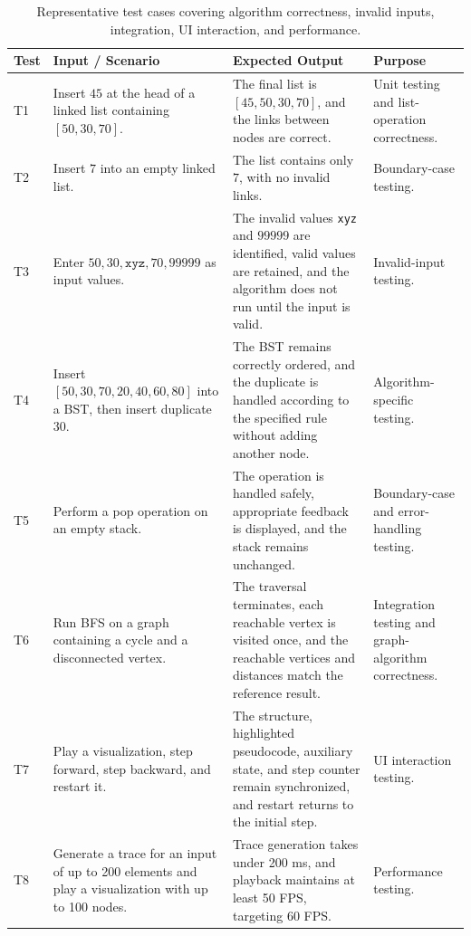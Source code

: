 \documentclass[11pt,a4paper]{article}
\renewcommand{\arraystretch}{1.06}
\begin{document}
\begin{table}[H]
\centering
\small
\renewcommand{\arraystretch}{1.3}
\begin{tabularx}{\textwidth}{
    @{}
    >{\centering\arraybackslash}p{}
    >{\raggedright\arraybackslash}p{}
    >{\raggedright\arraybackslash}X
    >{\raggedright\arraybackslash}p{}
    @{}
}
\toprule
\textbf{Test} &
\textbf{Input / Scenario} &
\textbf{Expected Output} &
\textbf{Purpose} \\
\midrule

T1 &
Insert $45$ at the head of a linked list containing $[50, 30, 70]$. &
The final list is $[45, 50, 30, 70]$, and the links between nodes are correct. &
Unit testing and list-operation correctness. \\

T2 &
Insert $7$ into an empty linked list. &
The list contains only $7$, with no invalid links. &
Boundary-case testing. \\

T3 &
Enter $50, 30, \texttt{xyz}, 70, 99999$ as input values. &
The invalid values \texttt{xyz} and $99999$ are identified, valid values are retained, and the algorithm does not run until the input is valid. &
Invalid-input testing. \\

T4 &
Insert $[50, 30, 70, 20, 40, 60, 80]$ into a BST, then insert duplicate $30$. &
The BST remains correctly ordered, and the duplicate is handled according to the specified rule without adding another node. &
Algorithm-specific testing. \\

T5 &
Perform a pop operation on an empty stack. &
The operation is handled safely, appropriate feedback is displayed, and the stack remains unchanged. &
Boundary-case and error-handling testing. \\

T6 &
Run BFS on a graph containing a cycle and a disconnected vertex. &
The traversal terminates, each reachable vertex is visited once, and the reachable vertices and distances match the reference result. &
Integration testing and graph-algorithm correctness. \\

T7 &
Play a visualization, step forward, step backward, and restart it. &
The structure, highlighted pseudocode, auxiliary state, and step counter remain synchronized, and restart returns to the initial step. &
UI interaction testing. \\

T8 &
Generate a trace for an input of up to 200 elements and play a visualization with up to 100 nodes. &
Trace generation takes under 200 ms, and playback maintains at least 50 FPS, targeting 60 FPS. &
Performance testing. \\

\bottomrule
\end{tabularx}

\caption{Representative test cases covering algorithm correctness, invalid inputs, integration, UI interaction, and performance.}
\label{tab:cases}
\end{table}
\end{document}
